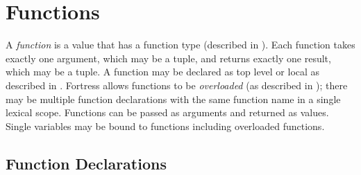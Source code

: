 %
%
%
%

\chapter{Functions}



A \emph{function} is a value that has a function type
(described in ).
Each function takes exactly one argument, which may be a tuple, and returns
exactly one result, which may be a tuple.
A function may be declared as top level or local as described
in .
Fortress allows functions to be \emph{overloaded} (as described in
); there may be multiple function
declarations with the same function name in a single lexical scope.
Functions can be passed as arguments and returned as values.
Single variables may be bound to functions
including overloaded functions.

\section{Function Declarations}

